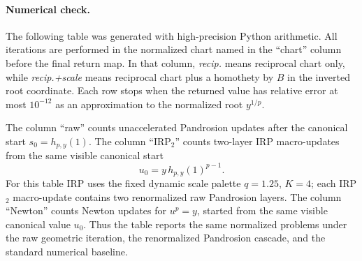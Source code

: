 \documentclass[10pt,a4paper]{article}
\theoremstyle{plain}
\theoremstyle{definition}
\theoremstyle{remark}
\begin{document}
\paragraph{Numerical check.}
The following table was generated with high-precision Python arithmetic.  All
iterations are performed in the normalized chart named in the ``chart'' column
before the final return map.  In that column, \emph{recip.} means reciprocal
chart only, while \emph{recip.+scale} means reciprocal chart plus a homothety
by $B$ in the inverted root coordinate.  Each row stops when the returned value
has relative error at most $10^{-12}$ as an approximation to the normalized
root $y^{1/p}$.

The column ``raw'' counts unaccelerated Pandrosion updates after the canonical
start $s_0=h_{p,y}(1)$.  The column ``IRP$_2$'' counts two-layer IRP
macro-updates from the same visible canonical start
\[
  u_0=y\,h_{p,y}(1)^{p-1}.
\]
For this table IRP uses the fixed dynamic scale palette $q=1.25$, $K=4$; each
IRP$_2$ macro-update contains two renormalized raw Pandrosion layers.  The
column ``Newton'' counts Newton updates for $u^p=y$, started from the same
visible canonical value $u_0$.  Thus the table reports the same normalized
problems under the raw geometric iteration, the renormalized Pandrosion
cascade, and the standard numerical baseline.

\begin{center}
\scriptsize
{}
\end{center}
\end{document}
